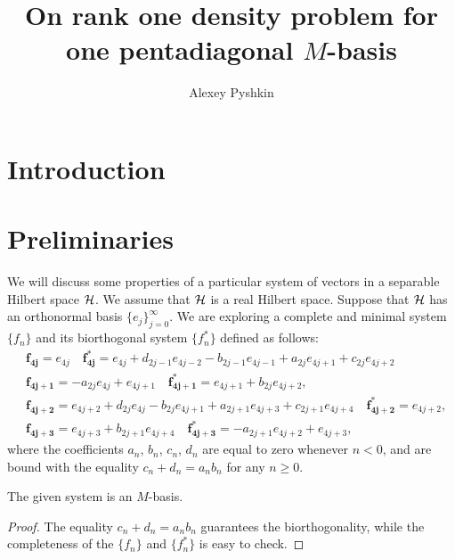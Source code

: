 \documentclass[12pt]{amsart}
\theoremstyle{case}
\begin{document}
\title{On rank one density problem for one pentadiagonal $M$-basis}
\author{Alexey Pyshkin}
\maketitle

\section{Introduction}
\section{Preliminaries}
  We will discuss some properties of a particular system of vectors in a separable Hilbert space $\cal{H}$.
  We assume that $\cal{H}$ is a real Hilbert space. 
  Suppose that $\cal{H}$ has an orthonormal basis $\{e_j\}_{j=0}^\infty$.
  We are exploring a complete and minimal system $\{f_n\}$ and its biorthogonal system $\{f^*_n\}$ defined as follows:
  \begin{equation}
    \label{main-system}
    \begin{aligned}
      &\mathbf{f_{4j}} = e_{4j} \quad 
      \mathbf{f^*_{4j}} = e_{4j} + d_{2j - 1} e_{4j-2} - b_{2j-1} e_{4j-1} + a_{2j} e_{4j+1} + c_{2j} e_{4j+2}\\
      &\mathbf{f_{4j+1}} = -a_{2j} e_{4j} + e_{4j+1} \quad 
      \mathbf{f^*_{4j+1}} = e_{4j+1} + b_{2j} e_{4j+2},\\
      &\mathbf{f_{4j+2}} = e_{4j+2} + d_{2j} e_{4j} - b_{2j} e_{4j+1} + a_{2j+1} e_{4j+3} + c_{2j+1} e_{4j+4}\quad
      \mathbf{f^*_{4j+2}} = e_{4j+2},\\
      &\mathbf{f_{4j+3}} = e_{4j+3} + b_{2j+1} e_{4j+4}\quad
      \mathbf{f^*_{4j+3}} = -a_{2j+1} e_{4j+2} + e_{4j+3},
    \end{aligned}
  \end{equation}
    where the coefficients $a_n$, $b_n$, $c_n$, $d_n$ are equal to zero whenever $n < 0$, and are bound with the equality
      $c_n + d_n = a_n b_n$ for any $n \geq 0$. 
  \begin{prop}
    The given system is an $M$-basis.
  \end{prop}
  \begin{proof}
    The equality $c_n + d_n = a_n b_n$ guarantees the bi\-orthogonality,
      while the completeness of the $\{f_n\}$ and $\{f_n^*\}$ is easy to check.
  \end{proof}
  
\end{document}
